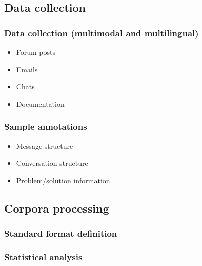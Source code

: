 \documentclass[11pt]{article}
\begin{document}
\subsection{Data collection}

\subsubsection{Data collection (multimodal and multilingual)}

\begin{itemize}
	\item Forum posts
	\item Emails
	\item Chats
	\item Documentation
\end{itemize}

\subsubsection{Sample annotations}

\begin{itemize}
	\item Message structure
	\item Conversation structure
	\item Problem/solution information
\end{itemize}

\subsection{Corpora processing}

\subsubsection{Standard format definition}

\subsubsection{Statistical analysis}
\end{document}
